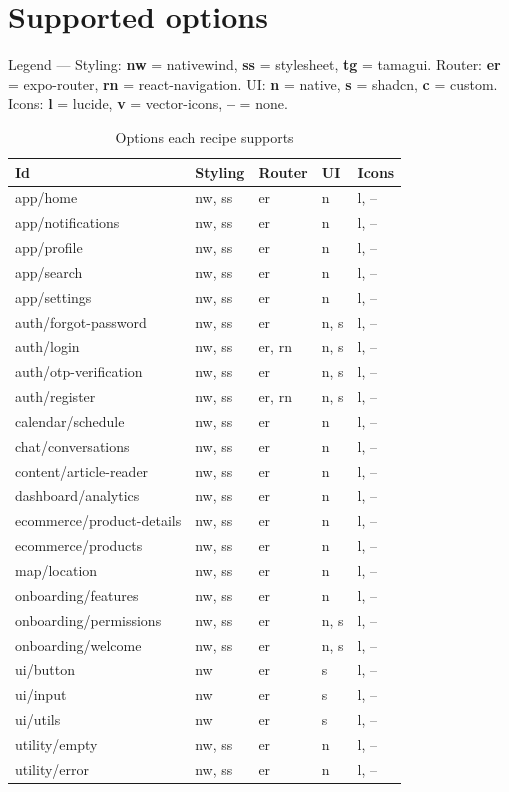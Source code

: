 \section{Supported options}

Legend --- Styling: \textbf{nw} = nativewind, \textbf{ss} = stylesheet,
\textbf{tg} = tamagui. Router: \textbf{er} = expo-router, \textbf{rn} =
react-navigation. UI: \textbf{n} = native, \textbf{s} = shadcn, \textbf{c} =
custom. Icons: \textbf{l} = lucide, \textbf{v} = vector-icons, \textbf{--} =
none.

\begin{longtable}{p{3.8cm}p{2.7cm}p{2.2cm}p{2.2cm}p{2.9cm}}
\caption{Options each recipe supports}\\
\toprule
\textbf{Id} & \textbf{Styling} & \textbf{Router} & \textbf{UI} & \textbf{Icons} \\
\midrule

app/home & nw, ss & er & n & l, -- \\
app/notifications & nw, ss & er & n & l, -- \\
app/profile & nw, ss & er & n & l, -- \\
app/search & nw, ss & er & n & l, -- \\
app/settings & nw, ss & er & n & l, -- \\
auth/forgot-password & nw, ss & er & n, s & l, -- \\
auth/login & nw, ss & er, rn & n, s & l, -- \\
auth/otp-verification & nw, ss & er & n, s & l, -- \\
auth/register & nw, ss & er, rn & n, s & l, -- \\
calendar/schedule & nw, ss & er & n & l, -- \\
chat/conversations & nw, ss & er & n & l, -- \\
content/article-reader & nw, ss & er & n & l, -- \\
dashboard/analytics & nw, ss & er & n & l, -- \\
ecommerce/product-details & nw, ss & er & n & l, -- \\
ecommerce/products & nw, ss & er & n & l, -- \\
map/location & nw, ss & er & n & l, -- \\
onboarding/features & nw, ss & er & n & l, -- \\
onboarding/permissions & nw, ss & er & n, s & l, -- \\
onboarding/welcome & nw, ss & er & n, s & l, -- \\
ui/button & nw & er & s & l, -- \\
ui/input & nw & er & s & l, -- \\
ui/utils & nw & er & s & l, -- \\
utility/empty & nw, ss & er & n & l, -- \\
utility/error & nw, ss & er & n & l, -- \\
\bottomrule
\end{longtable}


